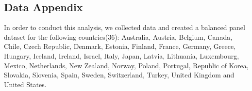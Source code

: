 \documentclass[]{amsart}
\begin{document}
\setcounter{table}{0} \renewcommand{\thetable}{B\arabic{table}}
\begin{appendices}


\section{Data Appendix}
  
  
    \thispagestyle{empty}
		\begin{table}[] \centering 
		\end{table} 
  
In order to conduct this analysis, we collected data and created a balanced panel dataset for the following countries(36):
Australia, Austria, Belgium, Canada, Chile, Czech Republic, Denmark, Estonia, Finland, France, Germany, Greece, Hungary, Iceland, Ireland, Israel, Italy, Japan, Latvia, Lithuania, Luxembourg, Mexico, Netherlands, New Zealand, Norway, Poland, Portugal, Republic of Korea, Slovakia, Slovenia, Spain, Sweden, Switzerland, Turkey, United Kingdom and United States.


\end{appendices}
\end{document}
